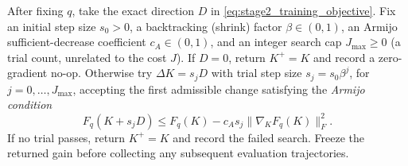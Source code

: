 \begin{definition}
\label{def:stage2_backtracking}
After fixing $q$, take the exact direction $D$ in
\eqref{eq:stage2_training_objective}. Fix an initial step size $s_0>0$, a
backtracking (shrink) factor $\beta\in(0,1)$, an Armijo sufficient-decrease
coefficient $c_A\in(0,1)$, and an integer search cap $J_{\max}\ge0$
(a trial count, unrelated to the cost $J$). If $D=0$, return
$K^+=K$ and record a zero-gradient no-op. Otherwise try
$\Delta K=s_jD$ with trial step size $s_j=s_0\beta^j$, for
$j=0,\ldots,J_{\max}$, accepting the first admissible change satisfying
the \emph{Armijo condition}
\begin{equation}
\label{eq:stage2_armijo}
 F_q(K+s_jD)\le F_q(K)-c_A s_j\|\nabla_KF_q(K)\|_F^2.
\end{equation}
If no trial passes, return $K^+=K$ and record the failed search. Freeze
the returned gain before collecting any subsequent evaluation trajectories.
\end{definition}

